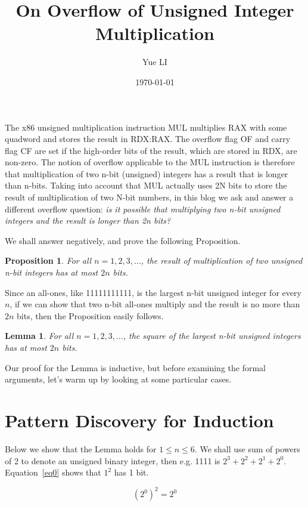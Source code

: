 \documentclass{article}
\title{On Overflow of Unsigned Integer Multiplication}
\author{Yue LI}
\date{\today}
\newtheorem*{proposition}{Proposition}
\newtheorem*{lemma}{Lemma}
\begin{document}
\maketitle
The x86 unsigned multiplication instruction MUL multiplies RAX with some quadword and stores the result in RDX:RAX.  The overflow flag OF and carry flag CF are set if the high-order bits of the result, which are stored in RDX, are non-zero. The notion of overflow applicable to the MUL instruction is therefore that multiplication of two n-bit (unsigned) integers has a result that is longer than n-bits. Taking into account that MUL actually uses 2N bits to store the result of multiplication of two N-bit numbers, in this blog we ask and answer a different overflow question: \emph{is it possible that multiplying two n-bit unsigned integers and the result is longer than 2n bits?}

We shall answer negatively, and prove the following Proposition.

\begin{proposition}
  For all $n=1,2,3,\ldots$, the result of multiplication of two unsigned n-bit integers has at most $2n$ bits.
\end{proposition}

Since an all-ones, like 11111111111, is the largest n-bit unsigned integer for every $n$, if we can show that two n-bit all-ones multiply and the result is no more than $2n$ bits, then the Proposition easily follows. 

\begin{lemma}
  For all $n=1,2,3,\ldots$, the square of the largest n-bit unsigned integers has at most $2n$ bits.
\end{lemma}

Our proof for the Lemma is inductive, but before examining the formal arguments, let's warm up by looking at some particular cases.

\section{Pattern Discovery for Induction}

Below we show that the Lemma holds for $1\leq n\leq 6$. We shall use sum of powers of 2 to denote an unsigned binary integer, then e.g. 1111 is $2^3+2^2+2^1+2^0$. Equation~\ref{eq0} shows that $1^2$ has 1 bit.

\begin{equation} \label{eq0}
(2^0)^2=2^0
\end{equation}
\end{document}
